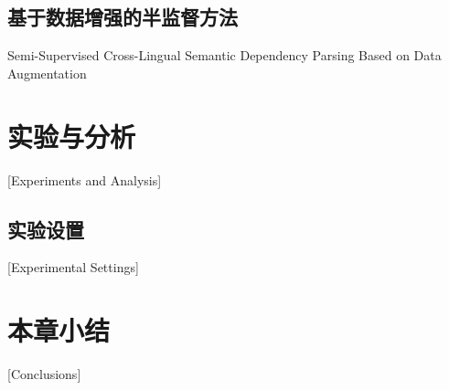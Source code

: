 \subsection{基于数据增强的半监督方法}{Semi-Supervised Cross-Lingual Semantic Dependency Parsing Based on Data Augmentation}

\section{实验与分析}[Experiments and Analysis]

\subsection{实验设置}[Experimental Settings]


\section{本章小结}[Conclusions]


